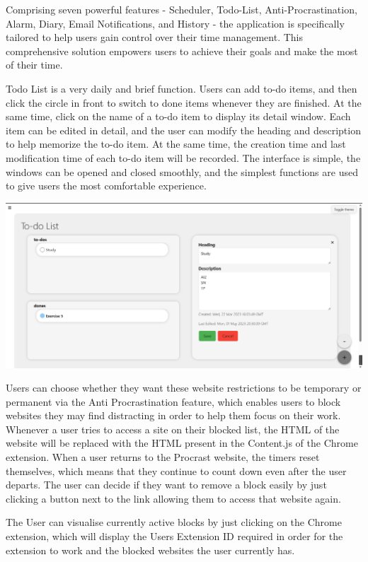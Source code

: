 \documentclass[a4paper]{article}
\begin{document}
Comprising seven powerful features - Scheduler, Todo-List, Anti-Procrastination, Alarm, Diary, Email Notifications, and History - the application is specifically tailored to help users gain control over their time management. This comprehensive solution empowers users to achieve their goals and make the most of their time.

Todo List is a very daily and brief function. Users can add to-do items, and then click the circle in front to switch to done items whenever they are finished. At the same time, click on the name of a to-do item to display its detail window. Each item can be edited in detail, and the user can modify the heading and description to help memorize the to-do item. At the same time, the creation time and last modification time of each to-do item will be recorded. The interface is simple, the windows can be opened and closed smoothly, and the simplest functions are used to give users the most comfortable experience.

{\noindent\includegraphics[width=\linewidth]{./image/Todo_list_light.png}}

Users can choose whether they want these website restrictions to be temporary or permanent via the Anti Procrastination feature, which enables users to block websites they may find distracting in order to help them focus on their work.
Whenever a user tries to access a site on their blocked list, the HTML of the
website will be replaced with the HTML present in the Content.js of the Chrome extension.
When a user returns to the Procrast website, the timers reset themselves, which means that they continue to count down even after the user departs.
The user can decide if they want to remove a block easily by just clicking a button next to the link allowing them to access that website again.

The User can visualise currently active blocks by just clicking on the Chrome extension,  which will display the Users Extension ID required in order for the extension to work and the blocked websites the user currently has.
\end{document}
